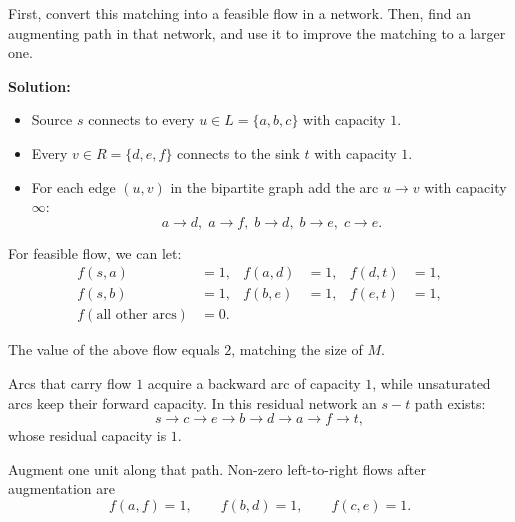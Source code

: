 \documentclass{article}
\begin{document}
\begin{enumerate}
\begin{center}
    \end{center}

    First, convert this matching into a feasible flow in a network. Then, find an augmenting path in that network, and use it to improve the matching to a larger one.

    \textbf{Solution:}
\begin{itemize}
    \item Source \(s\) connects to every \(u\in L=\{a,b,c\}\) with capacity \(1\).
    \item Every \(v\in R=\{d,e,f\}\) connects to the sink \(t\) with capacity \(1\).
    \item For each edge \((u,v)\) in the bipartite graph add the arc \(u\to v\) with capacity \(\infty\):
          \[
          a\to d,\; a\to f,\; b\to d,\; b\to e,\; c\to e .
          \]
\end{itemize}

For feasible flow, we can let:
\begin{align*}
f(s,a)&=1, & f(a,d)&=1, & f(d,t)&=1,\\
f(s,b)&=1, & f(b,e)&=1, & f(e,t)&=1,\\
f(\text{all other arcs})&=0.
\end{align*}

The value of the above flow equals \(2\), matching the size of \(M\).

Arcs that carry flow \(1\) acquire a backward arc of capacity \(1\), while unsaturated arcs keep their forward capacity.
In this residual network an \(s\!-\!t\) path exists:
\[
s\to c\to e\to b\to d\to a\to f\to t,
\]
whose residual capacity is \(1\).

Augment one unit along that path.  
Non-zero left-to-right flows after augmentation are
\[
f(a,f)=1,\qquad
f(b,d)=1,\qquad
f(c,e)=1.
\]


\end{enumerate}
\end{document}

